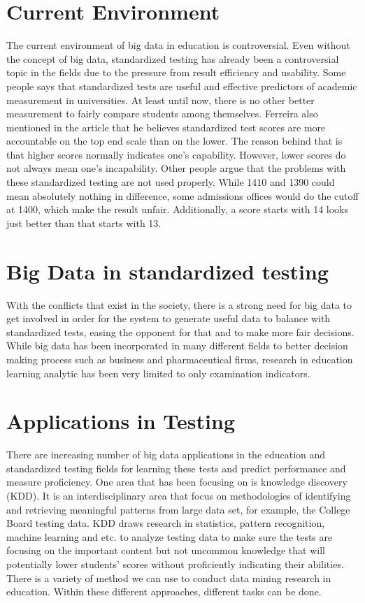 \documentclass[sigconf]{acmart}
\begin{document}
\section{Current Environment}
The current environment of big data in education is controversial. Even without the concept of big data, standardized testing has already been a controversial topic in the fields due to the pressure from result efficiency and usability. Some people says that standardized tests are useful and effective predictors of academic measurement in universities. \cite {Ferreira2014}At least until now, there is no other better measurement to fairly compare students among themselves. Ferreira also mentioned in the article that he believes standardized test scores are more accountable on the top end scale than on the lower. The reason behind that is that higher scores normally indicates one's capability. However, lower scores do not always mean one's incapability. \cite {Ferreira2014}
Other people argue that the problems with these standardized testing are not used properly. While 1410 and 1390 could mean absolutely nothing in difference, some admissions offices would do the cutoff at 1400, which make the result unfair. Additionally, a score starts with 14 looks just better than that starts with 13.

\section{Big Data in standardized testing}
With the conflicts that exist in the society, there is a strong need for big data to get involved in order for the system to generate useful data to balance with standardized tests, easing the opponent for that and to make more fair decisions. While big data has been incorporated in many different fields to better decision making process such as business and pharmaceutical firms, research in education learning analytic has been very limited to only examination indicators. 

\section{Applications in Testing}
There are increasing number of big data applications in the education and standardized testing fields for learning these tests and predict performance and measure proficiency. One area that has been focusing on is knowledge discovery (KDD). It is an interdisciplinary area that focus on methodologies of identifying and retrieving meaningful patterns from large data set, for example, the College Board  testing data. KDD draws research in statistics, pattern recognition, machine learning and etc. to analyze testing data to make sure the tests are focusing on the important content but not uncommon knowledge that will potentially lower students' scores without proficiently indicating their abilities\cite {Daniel2015}. There is a variety of method we can use to conduct data mining research in education. Within these different approaches, different tasks can be done.
\end{document}
